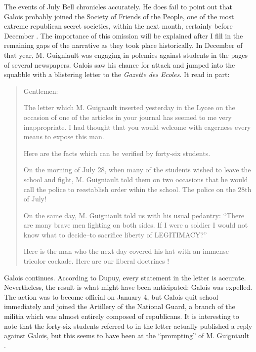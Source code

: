 \documentclass[12pt]{article}
\begin{document}
The events of July Bell chronicles accurately. He does fail to point out that Galois probably joined the Society of Friends of the People, one of the most extreme republican secret societies, within the next month, certainly before December \cite{39}. The importance of this omission will be explained after I fill in the remaining gaps of the narrative as they took place historically. In December of that year, M. Guigniault was engaging in polemics against students in the pages of several newspapers. Galois saw his chance for attack and jumped into the squabble with a blistering letter to the \emph{Gazette des Ecoles.} It read in part:

\begin{quotation}
\noindent
Gentlemen:
\medskip

The letter which M. Guignault inserted yesterday in the Lycee on the occasion of one of the articles in your journal has seemed to me very inappropriate. I had thought that you would welcome with eagerness every means to expose this man.

Here are the facts which can be verified by forty-six students.

On the morning of July 28, when many of the students wished to leave the school and fight, M. Guigniault told them on two occasions that he would call the police to reestablish order wihin the school. The police on the 28th of July!

On the same day, M. Guigniault told us with his usual pedantry: ``There are many brave men fighting on both sides. If I were a soldier I would not know what to decide--to sacrifice liberty of LEGITIMACY?''

Here is the man who the next day covered his hat with an immense tricolor cockade. Here are our liberal doctrines \cite{40}!
\end{quotation}
Galois continues. According to Dupuy, every statement in the letter is accurate. Nevertheless, the result is what might have been anticipated: Galois was expelled. The action was to become official on January 4, but Galois quit school immediately and joined the Artillery of the National Guard, a branch of the militia which was almost entirely composed of republicans. It is interesting to note that the forty-six students referred to in the letter actually published a reply against Galois, but this seems to have been at the ``prompting'' of M. Guigniault \cite{41}.
\end{document}
